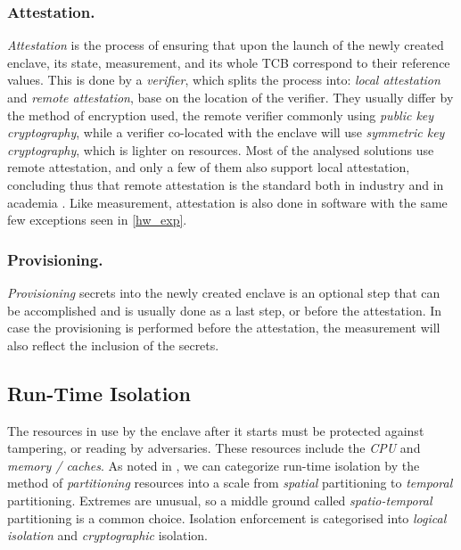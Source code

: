 \documentclass[runningheads,a4paper]{uwsese}
\begin{document}
\subsubsection{Attestation.}

\emph{Attestation} is the process of ensuring that upon the launch
of the newly created enclave, its state, measurement, and its
whole TCB correspond to their reference values. This is done by a
\emph{verifier}, which splits the process into: \emph{local
attestation} and \emph{remote attestation}, base on the location
of the verifier. They usually differ by the method of encryption
used, the remote verifier commonly using \emph{public key
cryptography}, while a verifier co-located with the enclave will
use \emph{symmetric key cryptography}, which is lighter on
resources. Most of the analysed solutions use remote attestation,
and only a few of them also support local attestation, concluding
thus that remote attestation is the standard both in industry and
in academia \cite{tee_hw_sup}. Like measurement, attestation is
also done in software with the same few exceptions seen in
\ref{hw_exp}.

\subsubsection{Provisioning.}

\emph{Provisioning} secrets into the newly created enclave is an optional step
that can be accomplished and is usually done as a last step, or before the
attestation. In case the provisioning is performed before the attestation, the measurement will also reflect the inclusion of the secrets. \cite{tee_hw_sup}

\subsection{Run-Time Isolation}

The resources in use by the enclave after it starts must be protected against
tampering, or reading by adversaries. These resources include the \emph{CPU}
and \emph{memory / caches}. As noted in \cite{tee_hw_sup}, we can categorize
run-time isolation by the method of \emph{partitioning} resources into a scale
from \emph{spatial} partitioning to \emph{temporal} partitioning. Extremes are
unusual, so a middle ground called \emph{spatio-temporal} partitioning is a
common choice. Isolation enforcement is categorised into \emph{logical
isolation} and \emph{cryptographic} isolation.
\end{document}

